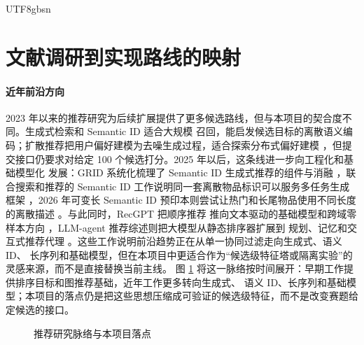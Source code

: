\documentclass[letterpaper,11pt,leqno]{article}
\begin{document}
\begin{CJK*}{UTF8}{gbsn}
\section{文献调研到实现路线的映射}

\paragraph{近年前沿方向}
2023 年以来的推荐研究为后续扩展提供了更多候选路线，但与本项目的契合度不同。生成式检索和 Semantic ID 适合大规模
召回，能启发候选目标的离散语义编码；扩散推荐把用户偏好建模为去噪生成过程，适合探索分布式偏好建模
\citep{wang2023diffrec}，但提交接口仍要求对给定 100 个候选打分。2025 年以后，这条线进一步向工程化和基础模型化
发展：GRID 系统化梳理了 Semantic ID 生成式推荐的组件与消融 \citep{ju2025grid}，联合搜索和推荐的 Semantic ID
工作说明同一套离散物品标识可以服务多任务生成框架 \citep{penha2025semanticids}，2026 年可变长 Semantic ID
预印本则尝试让热门和长尾物品使用不同长度的离散描述 \citep{khrylchenko2026semanticids}。与此同时，RecGPT 把顺序推荐
推向文本驱动的基础模型和跨域零样本方向 \citep{jiang2025recgpt}，LLM-agent 推荐综述则把大模型从静态排序器扩展到
规划、记忆和交互式推荐代理 \citep{peng2025llmagents}。这些工作说明前沿趋势正在从单一协同过滤走向生成式、语义 ID、
长序列和基础模型，但在本项目中更适合作为“候选级特征塔或隔离实验”的灵感来源，而不是直接替换当前主线。
图 \ref{f:literature-timeline} 将这一脉络按时间展开：早期工作提供排序目标和图推荐基础，近年工作更多转向生成式、
语义 ID、长序列和基础模型；本项目的落点仍是把这些思想压缩成可验证的候选级特征，而不是改变赛题给定候选的接口。

\begin{figure}[!htbp]
\caption{推荐研究脉络与本项目落点}
\label{f:literature-timeline}
\centering
{}
\end{figure}
\end{CJK*}
\end{document}
